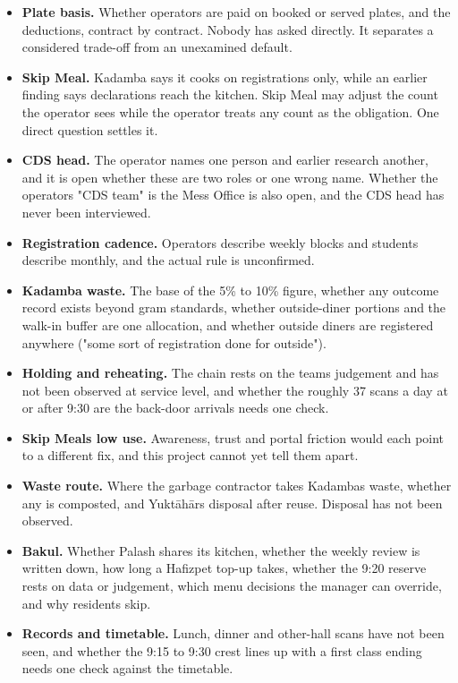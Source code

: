 \documentclass[
  10pt,
  table]{article}
\providecommand{\tightlist}{%
  \setlength{\itemsep}{0pt}\setlength{\parskip}{0pt}}
\renewcommand{\tightlist}{\setlength{\itemsep}{1.5pt}\setlength{\parskip}{0pt}}
\begin{document}
\begin{itemize}
\tightlist
\item
  \textbf{Plate basis.} Whether operators are paid on booked or served plates, and the deductions, contract by contract. Nobody has asked directly. It separates a considered trade-off from an unexamined default.
\item
  \textbf{Skip Meal.} Kadamba says it cooks on registrations only, while an earlier finding says declarations reach the kitchen. Skip Meal may adjust the count the operator sees while the operator treats any count as the obligation. One direct question settles it.
\item
  \textbf{CDS head.} The operator names one person and earlier research another, and it is open whether these are two roles or one wrong name. Whether the operators\textquotesingle{} "CDS team" is the Mess Office is also open, and the CDS head has never been interviewed.
\item
  \textbf{Registration cadence.} Operators describe weekly blocks and students describe monthly, and the actual rule is unconfirmed.
\item
  \textbf{Kadamba waste.} The base of the 5\% to 10\% figure, whether any outcome record exists beyond gram standards, whether outside-diner portions and the walk-in buffer are one allocation, and whether outside diners are registered anywhere ("some sort of registration done for outside").
\item
  \textbf{Holding and reheating.} The chain rests on the team\textquotesingle s judgement and has not been observed at service level, and whether the roughly 37 scans a day at or after 9:30 are the back-door arrivals needs one check.
\item
  \textbf{Skip Meal\textquotesingle s low use.} Awareness, trust and portal friction would each point to a different fix, and this project cannot yet tell them apart.
\item
  \textbf{Waste route.} Where the garbage contractor takes Kadamba\textquotesingle s waste, whether any is composted, and Yuktāhār\textquotesingle s disposal after reuse. Disposal has not been observed.
\item
  \textbf{Bakul.} Whether Palash shares its kitchen, whether the weekly review is written down, how long a Hafizpet top-up takes, whether the 9:20 reserve rests on data or judgement, which menu decisions the manager can override, and why residents skip.
\item
  \textbf{Records and timetable.} Lunch, dinner and other-hall scans have not been seen, and whether the 9:15 to 9:30 crest lines up with a first class ending needs one check against the timetable.
\end{itemize}
\end{document}
